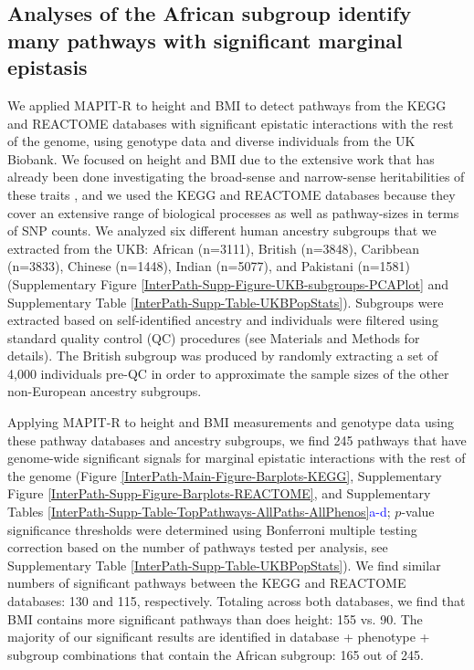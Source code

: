 \documentclass[12pt,a4paper]{article}
\begin{document}
\subsection{Analyses of the African subgroup identify many pathways with significant marginal epistasis}\label{InterPath-Results-PathwayEpistasis}

We applied MAPIT-R to height and BMI to detect pathways from the KEGG and REACTOME databases \citep{Liberzon2011} with significant epistatic interactions with the rest of the genome, using genotype data and diverse individuals from the UK Biobank. We focused on height and BMI due to the extensive work that has already been done investigating the broad-sense and narrow-sense heritabilities of these traits \citep{Yang2010,Elks2012,Visscher2012,Finucane2015,Speed2017,Wainschtein2019}, and we used the KEGG and REACTOME databases because they cover an extensive range of biological processes as well as pathway-sizes in terms of SNP counts. We analyzed six different human ancestry subgroups that we extracted from the UKB: African (n=3111), British (n=3848), Caribbean (n=3833), Chinese (n=1448), Indian (n=5077), and Pakistani (n=1581) (Supplementary Figure \ref{InterPath-Supp-Figure-UKB-subgroups-PCAPlot} and Supplementary Table \ref{InterPath-Supp-Table-UKBPopStats}). Subgroups were extracted based on self-identified ancestry and individuals were filtered using standard quality control (QC) procedures (see Materials and Methods for details). The British subgroup was produced by randomly extracting a set of 4,000 individuals pre-QC in order to approximate the sample sizes of the other non-European ancestry subgroups.

Applying MAPIT-R to height and BMI measurements and genotype data using these pathway databases and ancestry subgroups, we find 245 pathways that have genome-wide significant signals for marginal epistatic interactions with the rest of the genome (Figure \ref{InterPath-Main-Figure-Barplots-KEGG}, Supplementary Figure \ref{InterPath-Supp-Figure-Barplots-REACTOME}, and Supplementary Tables \ref{InterPath-Supp-Table-TopPathways-AllPaths-AllPhenos}\textcolor{blue}{a-d}; $p$-value significance thresholds were determined using Bonferroni multiple testing correction based on the number of pathways tested per analysis, see Supplementary Table \ref{InterPath-Supp-Table-UKBPopStats}). We find similar numbers of significant pathways between the KEGG and REACTOME databases: 130 and 115, respectively. Totaling across both databases, we find that BMI contains more significant pathways than does height: 155 vs. 90. The majority of our significant results are identified in database + phenotype + subgroup combinations that contain the African subgroup: 165 out of 245.
\end{document}
